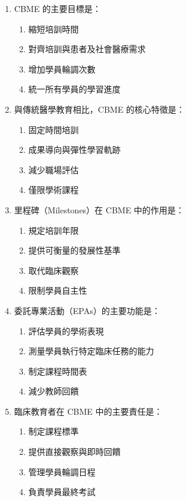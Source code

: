 \documentclass[12pt,a4paper]{article}
\begin{document}
\begin{enumerate}
    \item CBME 的主要目標是：
    \begin{enumerate}[label=\alph*)]
        \item 縮短培訓時間
        \item 對齊培訓與患者及社會醫療需求
        \item 增加學員輪調次數
        \item 統一所有學員的學習進度
    \end{enumerate}

    \item 與傳統醫學教育相比，CBME 的核心特徵是：
    \begin{enumerate}[label=\alph*)]
        \item 固定時間培訓
        \item 成果導向與彈性學習軌跡
        \item 減少職場評估
        \item 僅限學術課程
    \end{enumerate}

    \item 里程碑（Milestones）在 CBME 中的作用是：
    \begin{enumerate}[label=\alph*)]
        \item 規定培訓年限
        \item 提供可衡量的發展性基準
        \item 取代臨床觀察
        \item 限制學員自主性
    \end{enumerate}

    \item 委託專業活動（EPAs）的主要功能是：
    \begin{enumerate}[label=\alph*)]
        \item 評估學員的學術表現
        \item 測量學員執行特定臨床任務的能力
        \item 制定課程時間表
        \item 減少教師回饋
    \end{enumerate}

    \item 臨床教育者在 CBME 中的主要責任是：
    \begin{enumerate}[label=\alph*)]
        \item 制定課程標準
        \item 提供直接觀察與即時回饋
        \item 管理學員輪調日程
        \item 負責學員最終考試
    \end{enumerate}


\end{enumerate}
\end{document}
